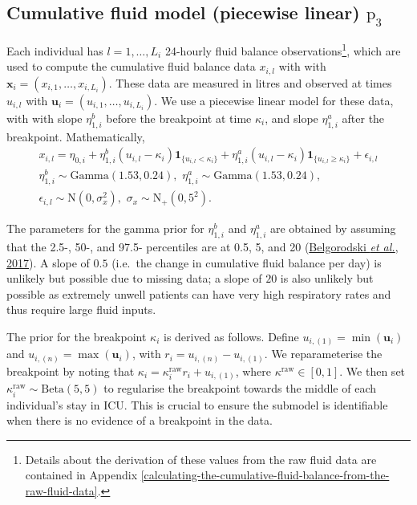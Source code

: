 \documentclass[
  10pt,
  a4paper,
]{article}
\newcommand{\pd}{\text{p}}
\begin{document}
\hypertarget{cumulative-fluid-model-piecewise-linear-pd_3}{%
\subsection{\texorpdfstring{Cumulative fluid model (piecewise linear)
\(\pd_{3}\)}{Cumulative fluid model (piecewise linear) \textbackslash pd\_\{3\}}}\label{cumulative-fluid-model-piecewise-linear-pd_3}}

Each individual has \(l = 1, \ldots, L_{i}\) 24-hourly fluid balance
observations\footnote{Details about the derivation of these values from
  the raw fluid data are contained in Appendix
  \ref{calculating-the-cumulative-fluid-balance-from-the-raw-fluid-data}.},
which are used to compute the cumulative fluid balance data \(x_{i, l}\)
with with \(\boldsymbol{x}_{i} = (x_{i, 1}, \ldots, x_{i, L_{i}})\).
These data are measured in litres and observed at times \(u_{i, l}\)
with \(\boldsymbol{u}_{i} = (u_{i, 1}, \ldots, u_{i, L_{i}})\). We use a
piecewise linear model for these data, with with slope
\(\eta_{1, i}^{b}\) before the breakpoint at time \(\kappa_{i}\), and
slope \(\eta_{1, i}^{a}\) after the breakpoint. Mathematically,
\begin{equation}
\begin{gathered}
  x_{i, l} = \eta_{0, i} + \eta^{b}_{1, i}(u_{i, l} - \kappa_{i})\boldsymbol{1}_{\{u_{i, l} < \kappa_{i}\}} + \eta^{a}_{1, i}(u_{i, l} - \kappa_{i})\boldsymbol{1}_{\{u_{i, l} \geq \kappa_{i}\}} + \epsilon_{i, l} \\
  \eta^{b}_{1, i} \sim \text{Gamma}(1.53, 0.24), \,\, \eta^{a}_{1, i} \sim \text{Gamma}(1.53, 0.24), \\
  \epsilon_{i, l} \sim \text{N}(0, \sigma^{2}_{x}),  \,\, \sigma_{x} \sim \text{N}_{+}(0, 5^2).
  \label{eqn:piecewise-fluid-model}
\end{gathered}
\end{equation}

The parameters for the gamma prior for \(\eta^{b}_{1, i}\) and
\(\eta^{a}_{1, i}\) are obtained by assuming that the 2.5-, 50-, and
97.5- percentiles are at 0.5, 5, and 20
(\protect\hyperlink{ref-belgorodski_rriskdistributions_2017}{Belgorodski
\emph{et al.}, 2017}). A slope of \(0.5\) (i.e.~the change in cumulative
fluid balance per day) is unlikely but possible due to missing data; a
slope of \(20\) is also unlikely but possible as extremely unwell
patients can have very high respiratory rates and thus require large
fluid inputs.

The prior for the breakpoint \(\kappa_{i}\) is derived as follows.
Define \(u_{i, (1)} = \min(\boldsymbol{u}_{i})\) and
\(u_{i, (n)} = \max(\boldsymbol{u}_{i})\), with
\(r_{i} = u_{i, (n)} - u_{i, (1)}\). We reparameterise the breakpoint by
noting that \(\kappa_{i} = \kappa^{\text{raw}}_{i}r_{i} + u_{i, (1)}\),
where \(\kappa^{\text{raw}} \in [0, 1]\). We then set
\(\kappa^{\text{raw}}_{i} \sim \text{Beta}(5, 5)\) to regularise the
breakpoint towards the middle of each individual's stay in ICU. This is
crucial to ensure the submodel is identifiable when there is no evidence
of a breakpoint in the data.
\end{document}
